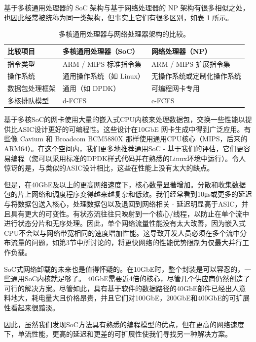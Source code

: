 基于多核通用处理器的 SoC 架构与基于网络处理器的 NP 架构有很多相似之处，也因此经常被统称为同一类架构，但事实上它们有很多区别，如表 \ref{background:tab:soc-vs-np} 所示。

\begin{table}[htbp]
	\begin{tabular}{l|p{}|p{}}
		\hline
		比较项目 & 多核通用处理器（SoC） & 网络处理器（NP） \\
		\hline
		\hline
		指令类型 & ARM / MIPS 标准指令集 & ARM / MIPS 扩展指令集 \\
		\hline
		操作系统 & 通用操作系统（如 Linux） & 无操作系统或定制化操作系统 \\
		\hline
		数据包处理框架 & 通用（如 DPDK） & 可编程网卡专用 \\
		\hline
		多核排队模型 & d-FCFS & c-FCFS \\
		\hline
	\end{tabular}
	\caption{多核通用处理器与网络处理器架构的比较。}
	\label{background:tab:soc-vs-np}
\end{table}



基于多核SoC的网卡使用大量的嵌入式CPU内核来处理数据包，交换一些性能以提供比ASIC设计更好的可编程性。这些设计在10GbE 网卡生成中得到广泛应用。有些像 Cavium 和 Broadcom BCM5880X 那样使用通用CPU核心（MIPS，后来的ARM64）。在这个空间内，我们更多地推荐通用SoC  - 基于我们的评估，它们更容易编程（您可以采用标准的DPDK样式代码并在熟悉的Linux环境中运行）。令人惊讶的是，与类似的ASIC设计相比，这些在性能上没有太大的缺点。

但是，在40GbE及以上的更高网络速度下，核心数量显著增加。分散和收集数据包的片上网络和调度程序变得越来越复杂和低效。我们经常看到10μs或更多的延迟与将数据包送入核心，处理数据包以及退回到网络相关 - 延迟明显高于ASIC，并且具有更大的可变性。有状态流往往只映射到一个核心/线程，以防止在单个流中进行状态分片和无序处理。因此，单个网络流量性能没有太大改善，因为嵌入式CPU不会以与网络带宽相同的速度增加性能。这导致开发人员必须在多个流中分布流量的问题，如第3节中所讨论的，将更快网络的性能优势限制为仅最大并行工作负载。



SoC式网络卸载的未来也是值得怀疑的。在10GbE时，整个封装是可以容忍的，一些通用SoC内核就足够了。 40GbE需要近4倍的核心，尽管几个供应商仍然创造了可行的解决方案。尽管如此，具有基于软件的数据路径的40GbE部件已经出人意料地大，耗电量大且价格昂贵，并且它们对100GbE，200GbE和400GbE的可扩展性看起来很黯淡。

因此，虽然我们发现SoC方法具有熟悉的编程模型的优点，但在更高的网络速度下，单流性能，更高的延迟和更差的可扩展性使我们寻找另一种解决方案。


